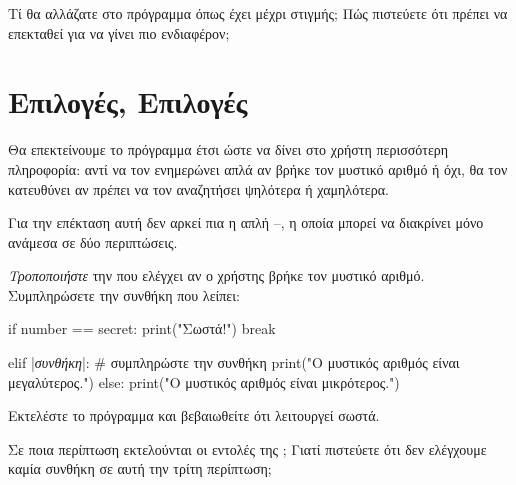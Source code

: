 \documentclass[a4paper,11pt,oneside]{book}
\begin{document}
\begin{step}
Τί θα αλλάζατε στο πρόγραμμα όπως έχει μέχρι στιγμής; Πώς πιστεύετε ότι πρέπει να επεκταθεί για να γίνει πιο ενδιαφέρον;

\marginnote[14pt]{\icondiscuss}
\dottedline

\dottedline
\end{step}

\section{Επιλογές, Επιλογές}

Θα επεκτείνουμε το πρόγραμμα έτσι ώστε να δίνει στο χρήστη περισσότερη πληροφορία: αντί να τον ενημερώνει απλά αν βρήκε τον μυστικό αριθμό ή όχι, θα τον κατευθύνει αν πρέπει να τον αναζητήσει ψηλότερα ή χαμηλότερα.

Για την επέκταση αυτή δεν αρκεί πια η απλή --, η οποία μπορεί να διακρίνει μόνο ανάμεσα σε δύο περιπτώσεις. 

\begin{step}
\emph{Τροποποιήστε} την  που ελέγχει αν ο χρήστης βρήκε τον μυστικό αριθμό. Συμπληρώσετε την συνθήκη που λείπει:

\begin{pyplain}
    if number == secret:
        print("Σωστά!")
        break
\end{pyplain}
\begin{pynew}
    elif |\textrm{\textit{συνθήκη}}|: # συμπληρώστε την συνθήκη
        print("Ο μυστικός αριθμός είναι μεγαλύτερος.")
    else:
        print("Ο μυστικός αριθμός είναι μικρότερος.")
\end{pynew}

Εκτελέστε το πρόγραμμα και βεβαιωθείτε ότι λειτουργεί σωστά. 

Σε ποια περίπτωση εκτελούνται οι εντολές της ; Γιατί πιστεύετε ότι δεν ελέγχουμε καμία συνθήκη σε αυτή την τρίτη περίπτωση;

\marginnote[14pt]{\icondiscuss}
\dottedline

\dottedline

\dottedline
\end{step}
\end{document}
